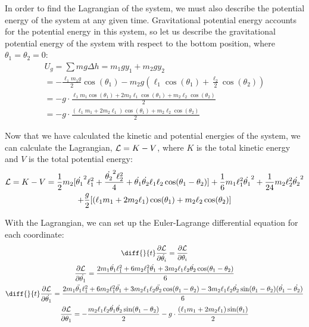 \documentclass[]{article}
\begin{document}
In order to find the Lagrangian of the system, we must also describe the potential energy of the system at any given time. Gravitational potential energy accounts for the potential energy in this system, so let us describe the gravitational potential energy of the system with respect to the bottom position, where $\theta_1 = \theta_2 = 0$:
\begin{gather*}
	U_g = \sum mg\Delta h = m_1gy_1 + m_2gy_2 \\
	= -\frac{\ell_1m_1g}{2}\cos(\theta_1) - m_2g(\ell_1\cos(\theta_1) + \frac{\ell_2}{2}\cos(\theta_2)) \\
	= -g\cdot\frac{\ell_1m_1\cos(\theta_1) + 2m_2\ell_1\cos(\theta_1) + m_2\ell_2\cos(\theta_2)}{2} \\
	= -g\cdot\frac{(\ell_1m_1 + 2m_2\ell_1)\cos(\theta_1) + m_2\ell_2\cos(\theta_2)}{2}
\end{gather*}

Now that we have calculated the kinetic and potential energies of the system, we can calculate the Lagrangian, $\mathcal{L} = K - V$, where $K$ is the total kinetic energy and $V$ is the total potential energy:
\begin{gather*}
	\mathcal{L} = K - V = \frac12m_2[\dot{\theta_1}^2\ell_1^2 + \frac{\dot{\theta_2}^2\ell_2^2}{4} + \dot{\theta_1}\dot{\theta_2}\ell_1\ell_2\cos(\theta_1 - \theta_2)] + \frac16m_1\ell_1^2\dot{\theta_1}^2 + \frac{1}{24}m_2\ell_2^2\dot{\theta_2}^2 \\ + \frac{g}{2}[(\ell_1m_1 + 2m_2\ell_1)\cos(\theta_1) + m_2\ell_2\cos(\theta_2)]
\end{gather*}

With the Lagrangian, we can set up the Euler-Lagrange differential equation for each coordinate:
\begin{gather*}
	\diff{}{t}\frac{\partial \lagr}{\partial \dot{\theta_i}} = \frac{\partial \lagr}{\partial \theta_i} \\
	\frac{\partial \lagr}{\partial \dot{\theta_1}} = \frac{2m_1\dot{\theta_1}\ell_1^2 + 6m_2\ell_1^2\dot{\theta_1} + 3m_2\ell_1\ell_2\dot{\theta_2}\cos(\theta_1 - \theta_2)}{6} \\
	\diff{}{t}\frac{\partial \lagr}{\partial \dot{\theta_1}} =  \frac{2m_1\ddot{\theta_1}\ell_1^2 + 6m_2\ell_1^2\ddot{\theta_1} + 3m_2\ell_1\ell_2\ddot{\theta_2}\cos(\theta_1 - \theta_2) - 3m_2\ell_1\ell_2\dot{\theta_2}\sin(\theta_1 - \theta_2)(\dot{\theta_1} - \dot{\theta_2})}{6} \\
	\frac{\partial \lagr}{\partial \theta_1} = -\frac{m_2\ell_1\ell_2\dot{\theta_1}\dot{\theta_2}\sin(\theta_1 - \theta_2)}{2} - g\cdot\frac{(\ell_1m_1 + 2m_2\ell_1)\sin(\theta_1)}{2} \\
\end{gather*}
\end{document}
